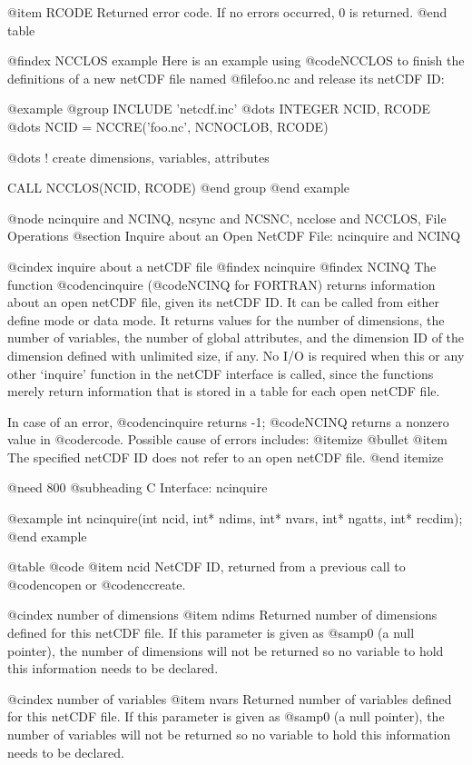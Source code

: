 @item RCODE
Returned error code.  If no errors occurred, 0 is returned.
@end table

@findex NCCLOS example
Here is an example using @code{NCCLOS} to finish the definitions of a
new netCDF file named @file{foo.nc} and release its netCDF ID:

@example
@group
      INCLUDE 'netcdf.inc'
         @dots{}
      INTEGER NCID, RCODE
         @dots{}
      NCID = NCCRE('foo.nc', NCNOCLOB, RCODE)

         @dots{}  ! create dimensions, variables, attributes

      CALL NCCLOS(NCID, RCODE)
@end group
@end example

@node ncinquire and NCINQ, ncsync and NCSNC, ncclose and NCCLOS, File Operations
@section Inquire about an Open NetCDF File:  ncinquire and NCINQ

@cindex inquire about a netCDF file
@findex ncinquire
@findex NCINQ
The function @code{ncinquire} (@code{NCINQ} for FORTRAN) returns
information about an open netCDF file, given its netCDF ID.  It can be
called from either define mode or data mode.  It returns values for the
number of dimensions, the number of variables, the number of global
attributes, and the dimension ID of the dimension defined with
unlimited size, if any.  No I/O is required when this or any other
`inquire' function in the netCDF interface is called, since the
functions merely return information that is stored in a table for each
open netCDF file.

In case of an error, @code{ncinquire} returns -1; @code{NCINQ} returns a
nonzero value in @code{rcode}.  Possible cause of errors includes:
@itemize @bullet
@item
The specified netCDF ID does not refer to an open netCDF file.
@end itemize

@need 800
@subheading C Interface:  ncinquire

@example
int ncinquire(int ncid, int* ndims, int* nvars, int* ngatts,
              int* recdim);
@end example

@table @code
@item ncid
NetCDF ID, returned from a previous call to @code{ncopen} or @code{nccreate}.

@cindex number of dimensions
@item ndims
Returned number of dimensions defined for this netCDF file.  If this
parameter is given as @samp{0} (a null pointer), the number of
dimensions will not be returned so no variable to hold this information
needs to be declared.

@cindex number of variables
@item nvars
Returned number of variables defined for this netCDF file.  If this
parameter is given as @samp{0} (a null pointer), the number of variables will not be
returned so no variable to hold this information needs to be declared.

